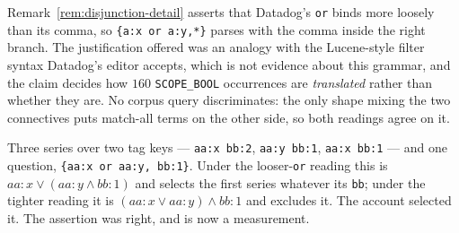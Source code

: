 \begin{remark}\label{rem:precedence}
Remark~\ref{rem:disjunction-detail} asserts that Datadog's \texttt{or} binds more loosely
than its comma, so \texttt{\{a:x or a:y,*\}} parses with the comma inside the right
branch. The justification offered was an analogy with the Lucene-style filter syntax
Datadog's editor accepts, which is not evidence about this grammar, and the claim decides
how $160$ \texttt{SCOPE\_BOOL} occurrences are \emph{translated} rather than whether they
are. No corpus query discriminates: the only shape mixing the two connectives puts
match-all terms on the other side, so both readings agree on it.

Three series over two tag keys --- \texttt{aa:x bb:2}, \texttt{aa:y bb:1},
\texttt{aa:x bb:1} --- and one question, \texttt{\{aa:x or aa:y, bb:1\}}. Under the
looser-\texttt{or} reading this is $aa{:}x \vee (aa{:}y \wedge bb{:}1)$ and selects the
first series whatever its \texttt{bb}; under the tighter reading it is
$(aa{:}x \vee aa{:}y) \wedge bb{:}1$ and excludes it. The account selected it. The
assertion was right, and is now a measurement.
\end{remark}

